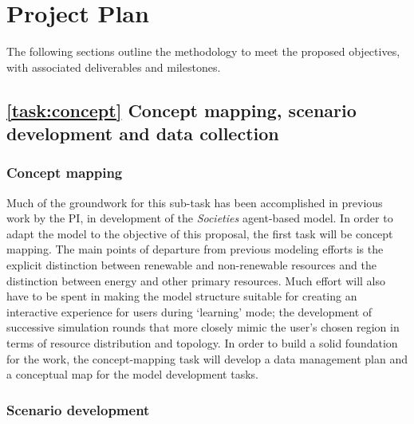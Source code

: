 \documentclass[11pt,a4paper]{article}
\begin{document}


\section{Project Plan}

The following sections outline the methodology to meet the proposed objectives, with associated deliverables and milestones.

\subsection{\ref{task:concept} Concept mapping, scenario development and data collection}
\label{sec:task:concept}

\subsubsection{Concept mapping}

Much of the groundwork for this sub-task 
has been accomplished in previous work by the PI,
in development of the \emph{Societies} agent-based model.
In order to adapt the model to the objective of this proposal,
the first task will be concept mapping.
The main points of departure from previous modeling efforts
is the explicit distinction between renewable and non-renewable resources
and the distinction between energy and other primary resources.
Much effort will also have to be spent in making the model structure suitable for
creating an interactive experience for users during `learning' mode;
the development of successive simulation rounds 
that more closely mimic the user's chosen region
in terms of resource distribution and topology.
In order to build a solid foundation for the work, 
the concept-mapping task will develop
a data management plan and 
a conceptual map for the model development tasks.

\subsubsection{Scenario development}
\end{document}
